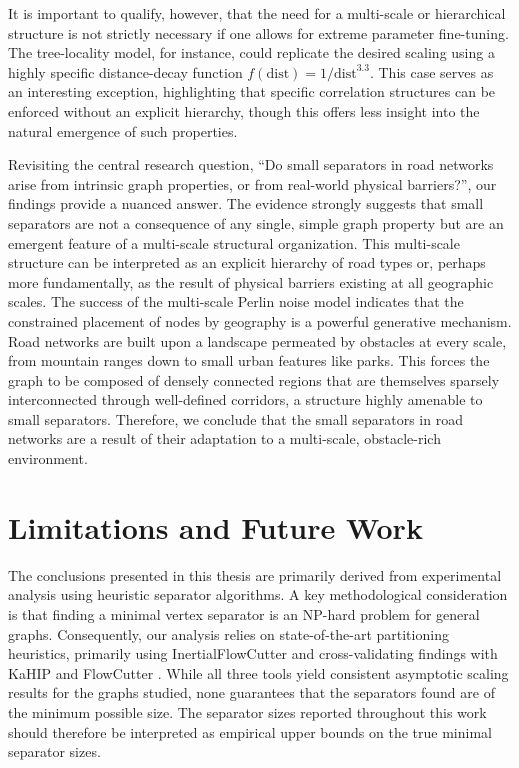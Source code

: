 It is important to qualify, however, that the need for a multi-scale or hierarchical structure is not strictly necessary if one allows for extreme parameter fine-tuning.
The tree-locality model, for instance, could replicate the desired scaling using a highly specific distance-decay function \(f(\text{dist}) = 1/\text{dist}^{3.3}\).
This case serves as an interesting exception, highlighting that specific correlation structures can be enforced without an explicit hierarchy, though this offers less insight into the natural emergence of such properties.

Revisiting the central research question, \enquote{Do small separators in road networks arise from intrinsic graph properties, or from real-world physical barriers?}, our findings provide a nuanced answer.
The evidence strongly suggests that small separators are not a consequence of any single, simple graph property but are an emergent feature of a multi-scale structural organization.
This multi-scale structure can be interpreted as an explicit hierarchy of road types or, perhaps more fundamentally, as the result of physical barriers existing at all geographic scales.
The success of the multi-scale Perlin noise model indicates that the constrained placement of nodes by geography is a powerful generative mechanism.
Road networks are built upon a landscape permeated by obstacles at every scale, from mountain ranges down to small urban features like parks.
This forces the graph to be composed of densely connected regions that are themselves sparsely interconnected through well-defined corridors, a structure highly amenable to small separators.
Therefore, we conclude that the small separators in road networks are a result of their adaptation to a multi-scale, obstacle-rich environment.

\section{Limitations and Future Work}
\label{sec:conclusion:future_work}

The conclusions presented in this thesis are primarily derived from experimental analysis using heuristic separator algorithms.
A key methodological consideration is that finding a minimal vertex separator is an NP-hard problem for general graphs.
Consequently, our analysis relies on state-of-the-art partitioning heuristics, primarily using InertialFlowCutter \cite{gottesburen_faster_2019} and cross-validating findings with KaHIP \cite{sanders_think_2013} and FlowCutter \cite{hamann_graph_2018}.
While all three tools yield consistent asymptotic scaling results for the graphs studied, none guarantees that the separators found are of the minimum possible size.
The separator sizes reported throughout this work should therefore be interpreted as empirical upper bounds on the true minimal separator sizes.

